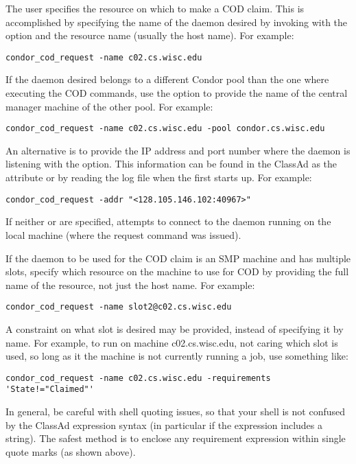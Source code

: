 The user specifies the resource on which to make a COD claim.
This is accomplished by specifying the name of the
 daemon desired by invoking
 with the  option and the
resource name (usually the host name).
For example:
\begin{verbatim}
condor_cod_request -name c02.cs.wisc.edu
\end{verbatim}

If the  daemon desired belongs to a different Condor
pool than the one where executing the COD commands,
use the  option to provide the name of the central manager
machine of the other pool.  For example:
\begin{verbatim}
condor_cod_request -name c02.cs.wisc.edu -pool condor.cs.wisc.edu
\end{verbatim}

An alternative is to provide the IP address and port number
where the  daemon is listening
with the  option.
This information can be found in the  ClassAd as the
attribute  or by reading the log file when the
 first starts up.
For example:
\begin{verbatim}
condor_cod_request -addr "<128.105.146.102:40967>"
\end{verbatim}
  
If neither  or  are specified,
 attempts to connect to the 
daemon running
on the local machine (where the request command was issued).

If the  daemon to be used for the COD claim is an SMP
machine and has multiple slots, specify which resource on
the machine to use for COD by providing the full name of the resource,
not just the host name.
For example:
\begin{verbatim}
condor_cod_request -name slot2@c02.cs.wisc.edu
\end{verbatim}

A constraint on what slot is desired may be provided,
instead of specifying it by name.  
For example, to run on machine c02.cs.wisc.edu,
not caring which slot is used,
so long as it the machine is not currently running a job,
use something like:
\begin{verbatim}
condor_cod_request -name c02.cs.wisc.edu -requirements 'State!="Claimed"'
\end{verbatim}

In general, be careful with shell quoting issues, so that
your shell is not confused by the ClassAd expression syntax (in
particular if the expression includes a string).
The safest method is to enclose any requirement expression
within single quote marks (as shown above).
 
